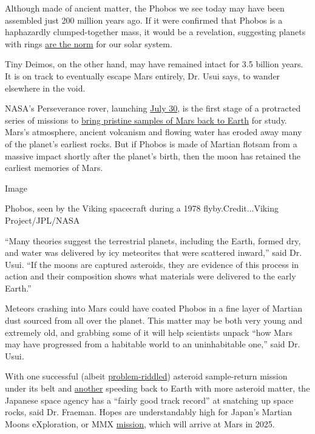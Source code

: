 Although made of ancient matter, the Phobos we see today may have been
assembled just 200 million years ago. If it were confirmed that Phobos
is a haphazardly clumped-together mass, it would be a revelation,
suggesting planets with rings
\href{https://webbtelescope.org/resource-gallery/articles/pagecontent/filter-articles/why-do-planets-have-rings?filterUUID=a776e097-0c60-421c-baec-1d8ad049bfb0}{are
the norm} for our solar system.

Tiny Deimos, on the other hand, may have remained intact for 3.5 billion
years. It is on track to eventually escape Mars entirely, Dr. Usui says,
to wander elsewhere in the void.

NASA's Perseverance rover, launching
\href{https://spaceflightnow.com/2020/06/24/launch-of-nasas-perseverance-mars-rover-delayed-to-july-22/}{July
30}, is the first stage of a protracted series of missions to
\href{https://www.scientificamerican.com/article/rocks-rockets-and-robots-the-plan-to-bring-mars-down-to-earth/}{bring
pristine samples of Mars back to Earth} for study. Mars's atmosphere,
ancient volcanism and flowing water has eroded away many of the planet's
earliest rocks. But if Phobos is made of Martian flotsam from a massive
impact shortly after the planet's birth, then the moon has retained the
earliest memories of Mars.

Image

Phobos, seen by the Viking spacecraft during a 1978
flyby.Credit...Viking Project/JPL/NASA

``Many theories suggest the terrestrial planets, including the Earth,
formed dry, and water was delivered by icy meteorites that were
scattered inward,'' said Dr. Usui. ``If the moons are captured
asteroids, they are evidence of this process in action and their
composition shows what materials were delivered to the early Earth.''

Meteors crashing into Mars could have coated Phobos in a fine layer of
Martian dust sourced from all over the planet. This matter may be both
very young and extremely old, and grabbing some of it will help
scientists unpack ``how Mars may have progressed from a habitable world
to an uninhabitable one,'' said Dr. Usui.

With one successful (albeit
\href{https://gizmodo.com/everything-that-could-go-wrong-for-hayabusa-did-and-ye-1730940605}{problem-riddled})
asteroid sample-return mission under its belt and
\href{https://www.nytimes3xbfgragh.onion/2020/03/23/science/japan-hayabusa2-asteroid-ryugu.html}{another}
speeding back to Earth with more asteroid matter, the Japanese space
agency has a ``fairly good track record'' at snatching up space rocks,
said Dr. Fraeman. Hopes are understandably high for Japan's Martian
Moons eXploration, or MMX
\href{http://mmx.isas.jaxa.jp/en/mission/}{mission}, which will arrive
at Mars in 2025.

